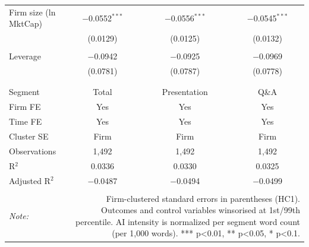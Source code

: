 \begin{table}[!htbp]
\begin{tabular}{@{\extracolsep{5pt}}lccc}
 Firm size (ln MktCap) & $-$0.0552$^{***}$ & $-$0.0556$^{***}$ & $-$0.0545$^{***}$ \\ 
  & (0.0129) & (0.0125) & (0.0132) \\ 
  & & & \\ 
 Leverage & $-$0.0942 & $-$0.0925 & $-$0.0969 \\ 
  & (0.0781) & (0.0787) & (0.0778) \\ 
  & & & \\ 
\hline \\[-1.8ex] 
Segment & Total & Presentation & Q\&A \\ 
Firm FE & Yes & Yes & Yes \\ 
Time FE & Yes & Yes & Yes \\ 
Cluster SE & Firm & Firm & Firm \\ 
Observations & 1,492 & 1,492 & 1,492 \\ 
R$^{2}$ & 0.0336 & 0.0330 & 0.0325 \\ 
Adjusted R$^{2}$ & $-$0.0487 & $-$0.0494 & $-$0.0499 \\ 
\hline 
\hline \\[-1.8ex] 
\textit{Note:}  & \multicolumn{3}{r}{Firm-clustered standard errors in parentheses (HC1). Outcomes and control variables winsorised at 1st/99th percentile. AI intensity is normalized per segment word count (per 1,000 words). *** p<0.01, ** p<0.05, * p<0.1.} \\ 
\end{tabular} 
\end{table} 
